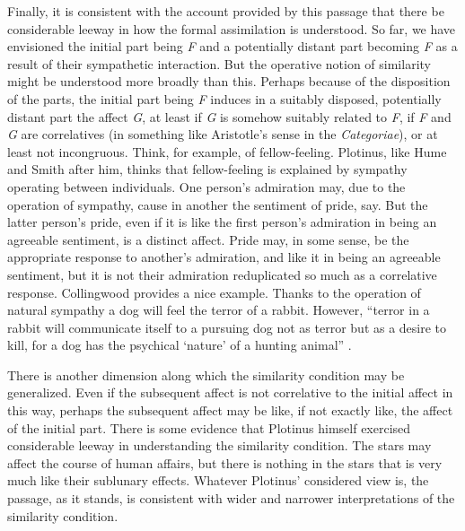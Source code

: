 Finally, it is consistent with the account provided by this passage that there be considerable leeway in how the formal assimilation is understood. So far, we have envisioned the initial part being \emph{F} and a potentially distant part becoming \emph{F} as a result of their sympathetic interaction. But the operative notion of similarity might be understood more broadly than this. Perhaps because of the disposition of the parts, the initial part being \emph{F} induces in a suitably disposed, potentially distant part the affect \emph{G}, at least if \emph{G} is somehow suitably related to \emph{F}, if \emph{F} and \emph{G} are correlatives (in something like Aristotle's sense in the \emph{Categoriae}), or at least not incongruous. Think, for example, of fellow-feeling. Plotinus, like Hume and Smith after him, thinks that fellow-feeling is explained by sympathy operating between individuals. One person's admiration may, due to the operation of sympathy, cause in another the sentiment of pride, say. But the latter person's pride, even if it is like the first person's admiration in being an agreeable sentiment, is a distinct affect. Pride may, in some sense, be the appropriate response to another's admiration, and like it in being an agreeable sentiment, but it is not their admiration reduplicated so much as a correlative response. Collingwood provides a nice example. Thanks to the operation of natural sympathy a dog will feel the terror of a rabbit. However, ``terror in a rabbit will communicate itself to a pursuing dog not as terror but as a desire to kill, for a dog has the psychical `nature' of a hunting animal'' \citep[231]{Collingwood:1938bh}.

There is another dimension along which the similarity condition may be generalized. Even if the subsequent affect is not correlative to the initial affect in this way, perhaps the subsequent affect may be like, if not exactly like, the affect of the initial part. There is some evidence that Plotinus himself exercised considerable leeway in understanding the similarity condition. The stars may affect the course of human affairs, but there is nothing in the stars that is very much like their sublunary effects. Whatever Plotinus' considered view is, the passage, as it stands, is consistent with wider and narrower interpretations of the similarity condition.

